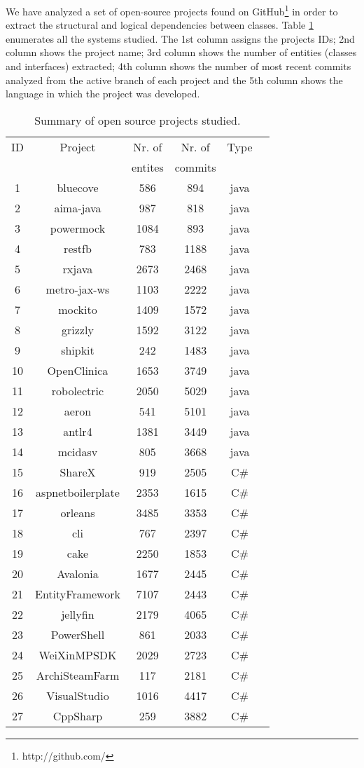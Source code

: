 \documentclass[a4paper,twoside]{article}
\begin{document}
We have analyzed a set of open-source projects found on GitHub\footnote{http://github.com/} \cite{Kalliamvakou2016} in order to extract the structural and logical dependencies between classes. Table \ref{table:1} enumerates all the systems studied. The 1st column assigns the projects IDs; 2nd column shows the project name; 3rd column shows the number of entities (classes and interfaces) extracted; 4th column shows the number of most recent commits analyzed from the active branch of each project and the 5th column shows the language in which the project was developed.
\begin{table}[!h]
\renewcommand{\arraystretch}{1.05}
\caption{Summary of open source projects studied.}
\label{table:1}
\centering
\begin{tabular}{|c|c|c|c|c|c|}
\hline
   ID  & Project    & Nr. of & Nr. of& Type\\
     &     & entites & commits & \\
\hline
1	&	bluecove	&	586	&	894	&	java	\\
2	&	aima-java	&	987	&	818	&	java	\\
3	&	powermock	&	1084	&	893	&	java	\\
4	&	restfb	&	783	&	1188	&	java	\\
5	&	rxjava	&	2673	&	2468	&	java	\\
6	&	metro-jax-ws	&	1103	&	2222	&	java	\\
7	&	mockito	&	1409	&	1572	&	java	\\
8	&	grizzly	&	1592	&	3122	&	java	\\
9	&	shipkit	&	242	&	1483	&	java	\\
10	&	OpenClinica	&	1653	&	3749	&	java	\\
11	&	robolectric	&	2050	&	5029	&	java	\\
12	&	aeron	&	541	&	5101	&	java	\\
13	&	antlr4	&	1381	&	3449	&	java	\\
14	&	mcidasv	&	805	&	3668	&	java	\\
15	&	ShareX	&	919	&	2505	&	C\#	\\
16	&	aspnetboilerplate	&	2353	&	1615	&	C\#	\\
17	&	orleans	&	3485	&	3353	&	C\#	\\
18	&	cli	&	767	&	2397	&	C\#	\\
19	&	cake	&	2250	&	1853	&	C\#	\\
20	&	Avalonia	&	1677	&	2445	&	C\#	\\
21	&	EntityFramework	&	7107	&	2443	&	C\#	\\
22	&	jellyfin	&	2179	&	4065	&	C\#	\\
23	&	PowerShell	&	861	&	2033	&	C\#	\\
24	&	WeiXinMPSDK	&	2029	&	2723	&	C\#	\\
25	&	ArchiSteamFarm	&	117	&	2181	&	C\#	\\
26	&	VisualStudio	&	1016	&	4417	&	C\#	\\
27	&	CppSharp	&	259	&	3882	&	C\#	\\
\hline
\end{tabular}
\end{table}
\end{document}
